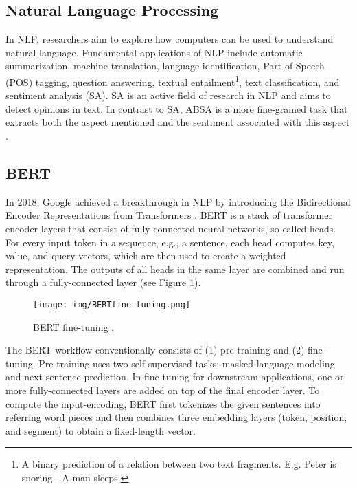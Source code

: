 \subsection{Natural Language Processing}
In NLP, researchers aim to explore how computers can be used to understand natural language. Fundamental applications of NLP include automatic summarization, machine translation, language identification, Part-of-Speech (POS) tagging, question answering, textual entailment\footnote{A binary prediction of a relation between two text fragments. E.g. Peter is snoring - A man sleeps.}, text classification, and sentiment analysis (SA). SA is an active field of research in NLP and aims to detect opinions in text. In contrast to SA, ABSA is a more fine-grained task that extracts both the aspect mentioned and the sentiment associated with this aspect \cite{pavlopoulos2014aspect}.

\subsection{BERT}
In 2018, Google achieved a breakthrough in NLP by introducing the Bidirectional Encoder Representations from Transformers \cite{devlin2018bert}. BERT is a stack of transformer encoder layers that consist of fully-connected neural networks, so-called heads. For every input token in a sequence, e.g., a sentence, each head computes key, value, and query vectors, which are then used to create a weighted representation. The outputs of all heads in the same layer are combined and run through a fully-connected layer (see Figure \ref{fig:BERT}).
\begin{figure}
    \centering
    \texttt{[image: img/BERTfine-tuning.png]}
    \caption{BERT fine-tuning \cite{devlin2018bert}.}
    \label{fig:BERT}
\end{figure}
The BERT workflow conventionally consists of (1) pre-training and (2) fine-tuning. Pre-training uses two self-supervised tasks: masked language modeling and next sentence prediction. In fine-tuning for downstream applications, one or more fully-connected layers are added on top of the final encoder layer. To compute the input-encoding, BERT first tokenizes the given sentences into referring word pieces and then combines three embedding layers (token, position, and segment) to obtain a fixed-length vector.

